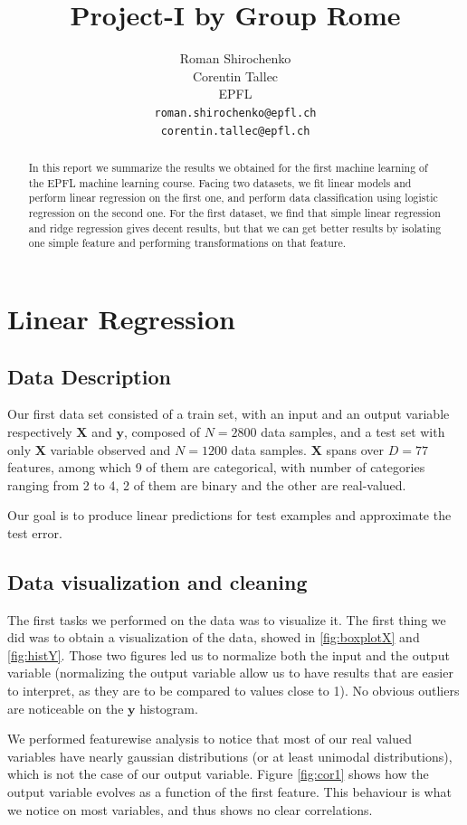\documentclass{article} %
\title{Project-I by Group Rome}
\author{
Roman Shirochenko\\
Corentin Tallec\\
EPFL \\
\texttt{roman.shirochenko@epfl.ch}\\
\texttt{corentin.tallec@epfl.ch} \\
}
\begin{document}
\maketitle

\begin{abstract}
	In this report we summarize the results we obtained for the first machine
	learning of the EPFL machine learning course. Facing two datasets, we fit
	linear models and perform linear regression on the first one, and perform data
	classification using logistic regression on the second one. For the first
	dataset, we find that simple linear regression and ridge regression gives
	decent results, but that we can get better results by isolating one simple
	feature and performing transformations on that feature.
\end{abstract}

\section{Linear Regression}
\subsection{Data Description}
Our first data set consisted of a train set, with an input and an output
variable respectively $\mathbf{X}$ and $\mathbf{y}$, composed of $N=2800$ data
samples, and a test set with only $\mathbf{X}$ variable observed and $N=1200$
data samples. $\mathbf{X}$ spans over $D=77$ features, among which 9 of them are
categorical, with number of categories ranging from 2 to 4, 2 of them are binary
and the other are real-valued.

Our goal is to produce linear predictions for test examples and approximate the
test error.

\subsection{Data visualization and cleaning}
The first tasks we performed on the data was to visualize it. The first thing we
did was to obtain a visualization of the data, showed in \ref{fig:boxplotX} and
\ref{fig:histY}. Those two figures led us to normalize both the input and the
output variable (normalizing the output variable allow us to have results that are
easier to interpret, as they are to be compared to values close to 1). No
obvious outliers are noticeable on the $\mathbf{y}$ histogram.

We performed featurewise analysis to notice that most of our real valued
variables have nearly gaussian distributions (or at least unimodal
distributions), which is not the case of our output variable. Figure
\ref{fig:cor1} shows how the output variable evolves as a function of the first
feature. This behaviour is what we notice on most variables, and thus shows no
clear correlations.
\end{document}
